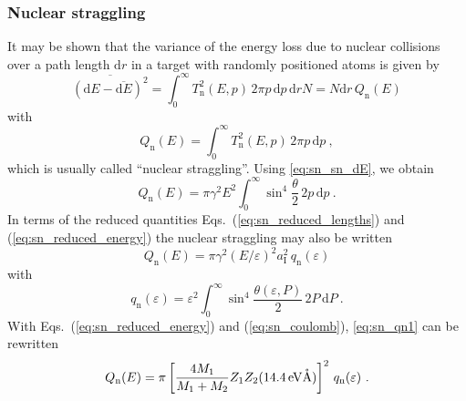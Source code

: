 \subsubsection{Nuclear straggling}
%
It may be shown \cite{Bohr1948} that the variance of the energy loss due to nuclear collisions over a path length $\mathrm{d} r$ in a target with randomly positioned atoms is given by
%
\begin{equation}
    \label{eq:sn_sn_Estraggle}
    \overline{ \left( \mathrm{d} E - \overline{\mathrm{d} E} \right)^2 } =
        \int_0^\infty T_\mathrm{n}^2(E,p) \,
        2 \pi p \, \mathrm{d} p \, \mathrm{d} r N =
    N \mathrm{d} r \, Q_\mathrm{n}(E)
\end{equation}
%
with
%
\begin{equation}
    Q_\mathrm{n}(E) = \int_0^\infty T_\mathrm{n}^2(E,p) \, 2 \pi p \, \mathrm{d} p ~,
\end{equation}
%
which is usually called ``nuclear straggling''. Using \cref{eq:sn_sn_dE}, we obtain
%
\begin{equation}
    Q_\mathrm{n}(E) = \pi \gamma^2 E^2 \int_0^\infty \sin ^4 \frac{\theta}{2} \, 2 p \, \mathrm{d} p ~.
\end{equation}
%
In terms of the reduced quantities Eqs.~(\ref{eq:sn_reduced_lengths}) and (\ref{eq:sn_reduced_energy}) the nuclear straggling may also be written
%
\begin{equation}
    \label{eq:sn_qn1}
    Q_\mathrm{n}(E) = \pi \gamma^2 (E/\varepsilon)^2 a_\mathrm{I}^2 \, q_\mathrm{n}(\varepsilon)
\end{equation}
%
with
%
\begin{equation}
    q_\mathrm{n}(\varepsilon) = \varepsilon^2 \int_0^\infty \sin^4 \frac{\theta(\varepsilon,P)}{2} \, 2 P \, \mathrm{d} P ~.
\end{equation}
%
With Eqs.~(\ref{eq:sn_reduced_energy}) and (\ref{eq:sn_coulomb}), \cref{eq:sn_qn1} can be rewritten
%
\begin{equation}
    \label{eq:sn_qn}
    Q_\mathrm{n}(E) =  \pi \left[ \frac{ 4 M_1 }{ M_1 + M_2 }
        Z_1 Z_2 (14.4 \,\mathrm{eV\mathring{\mathrm{A}}}) \right]^2 \, q_\mathrm{n}(\varepsilon) ~.
\end{equation}

